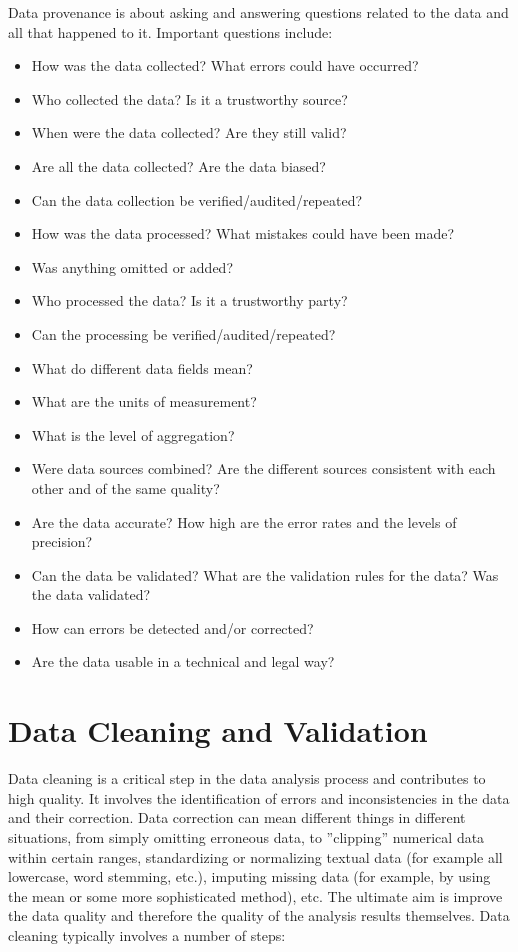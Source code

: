 Data provenance is about asking and answering questions related to the data and all that happened to it. Important questions include:
\begin{itemize}
	\item How was the data collected? What errors could have occurred?
	\item Who collected the data? Is it a trustworthy source?
	\item When were the data collected? Are they still valid?
	\item Are all the data collected? Are the data biased?
	\item Can the data collection be verified/audited/repeated?
	\item How was the data processed? What mistakes could have been made? 
	\item Was anything omitted or added?
	\item Who processed the data? Is it a trustworthy party?
	\item Can the processing be verified/audited/repeated?	
	\item What do different data fields mean? 
	\item What are the units of measurement? 
	\item What is the level of aggregation?
	\item Were data sources combined? Are the different sources consistent with each other and of the same quality?
	\item Are the data accurate? How high are the error rates and the levels of precision?
	\item Can the data be validated? What are the validation rules for the data? Was the data validated?
	\item How can errors be detected and/or corrected?
	\item Are the data usable in a technical and legal way?
\end{itemize}


\section{Data Cleaning and Validation}

Data cleaning is a critical step in the data analysis process and contributes to high quality. It involves the identification of errors and inconsistencies in the data and their correction. Data correction can mean different things in different situations, from simply omitting erroneous data, to ''clipping'' numerical data within certain ranges, standardizing or normalizing textual data (for example all lowercase, word stemming, etc.), imputing missing data (for example, by using the mean or some more sophisticated method), etc. The ultimate aim is improve the data quality and therefore the quality of the analysis results themselves. Data cleaning typically involves a number of steps:


